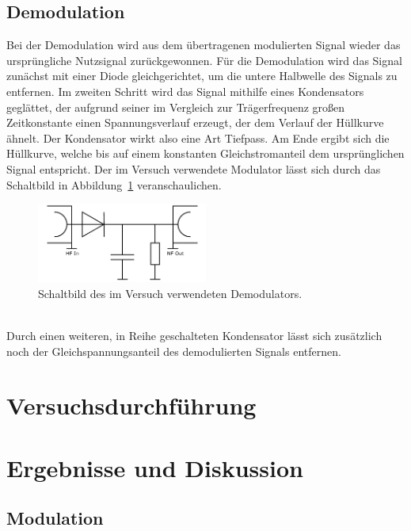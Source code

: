 \documentclass[a4paper,twoside,final]{article}
\begin{document}
\newpage
\subsection{Demodulation}
Bei der Demodulation wird aus dem übertragenen modulierten Signal wieder das ursprüngliche Nutzsignal zurückgewonnen. Für die Demodulation wird das Signal zunächst mit einer Diode gleichgerichtet, um die untere Halbwelle des Signals zu entfernen. Im zweiten Schritt wird das Signal mithilfe eines Kondensators geglättet, der aufgrund seiner im Vergleich zur Trägerfrequenz großen Zeitkonstante einen Spannungsverlauf erzeugt, der dem Verlauf der Hüllkurve ähnelt. Der Kondensator wirkt also eine Art Tiefpass. Am Ende ergibt sich die Hüllkurve, welche bis auf einem konstanten Gleichstromanteil dem ursprünglichen Signal entspricht. Der im Versuch verwendete Modulator lässt sich durch das Schaltbild in Abbildung~\ref{fig:Demodulator} veranschaulichen.
\begin{figure}[htp]
    \centering
    \includegraphics[width=0.5\textwidth]{Schaltungen/Demodulator.pdf}
    \caption{Schaltbild des im Versuch verwendeten Demodulators.}
    \label{fig:Demodulator}
\end{figure}\\
Durch einen weiteren, in Reihe geschalteten Kondensator lässt sich zusätzlich noch der Gleichspannungsanteil des demodulierten Signals entfernen.
\section{Versuchsdurchführung} \label{sec:Versuchsdurchführung}

\newpage
\section{Ergebnisse und Diskussion}

\subsection{Modulation}
\end{document}
